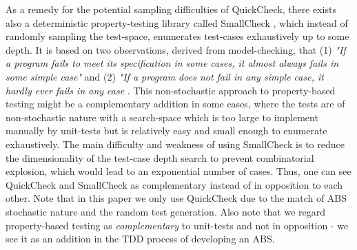 As a remedy for the potential sampling difficulties of QuickCheck, there exists also a deterministic property-testing library called SmallCheck \cite{runciman_smallcheck_2008}, which instead of randomly sampling the test-space, enumerates test-cases exhaustively up to some depth. It is based on two observations, derived from model-checking, that (1) \textit{"If a program fails to meet its specification in some cases, it almost always fails in some simple case"} and (2) \textit{"If a program does not fail in any simple case, it hardly ever fails in any case} \cite{runciman_smallcheck_2008}. This non-stochastic approach to property-based testing might be a complementary addition in some cases, where the tests are of non-stochastic nature with a search-space which is too large to implement manually by unit-tests but is relatively easy and small enough to enumerate exhaustively. The main difficulty and weakness of using SmallCheck is to reduce the dimensionality of the test-case depth search to prevent combinatorial explosion, which would lead to an exponential number of cases. Thus, one can see QuickCheck and SmallCheck as complementary instead of in opposition to each other.
Note that in this paper we only use QuickCheck due to the match of ABS stochastic nature and the random test generation. Also note that we regard property-based testing as \textit{complementary} to unit-tests and not in opposition - we see it as an addition in the TDD process of developing an ABS.